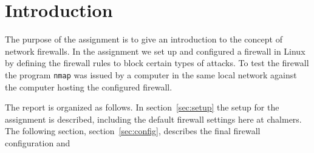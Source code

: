 \section{Introduction} 
\label{sec:intro}

The purpose of the assignment is to give an introduction to the concept of network firewalls. In the assignment we set up and configured a firewall in Linux by defining the firewall rules to block certain types of attacks. To test the firewall the program \texttt{nmap} was issued by a computer in the same local network against the computer hosting the configured firewall. 

The report is organized as follows. In section~\ref{sec:setup} the setup for the assignment is described, including the default firewall settings here at chalmers. The following section, section~\ref{sec:config}, describes the final firewall configuration and



